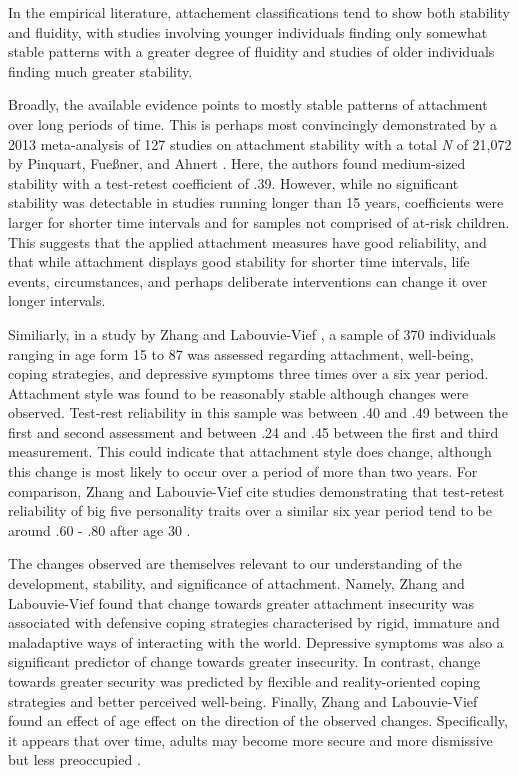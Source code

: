 \documentclass[12pt]{report}
\begin{document}
In the empirical literature, attachement classifications tend to show both stability and fluidity, with studies involving younger individuals finding only somewhat stable patterns with a greater degree of fluidity and studies of older individuals finding much greater stability.

Broadly, the available evidence points to mostly stable patterns of attachment over long periods of time. This is perhaps most convincingly demonstrated by a 2013 meta-analysis of 127 studies on attachment stability with a total \textit{N} of 21,072 by Pinquart, Fueßner, and Ahnert \cite{Pinquart2013}. Here, the authors found medium-sized stability with a test-retest coefficient of .39. However, while no significant stability was detectable in studies running longer than 15 years, coefficients were larger for shorter time intervals and for samples not comprised of at-risk children.
This suggests that the applied attachment measures have good reliability, and that while attachment displays good stability for shorter time intervals, life events, circumstances, and perhaps deliberate interventions can change it over longer intervals.

Similiarly, in a study by Zhang and Labouvie-Vief \cite{Zhang2004}, a sample of 370 individuals ranging in age form 15 to 87 was assessed regarding attachment, well-being, coping strategies, and depressive symptoms three times over a six year period. Attachment style was found to be reasonably stable although changes were observed. Test-rest reliability in this sample was between .40 and .49 between the first and second assessment and between .24 and .45 between the first and third measurement. This could indicate that attachment style does change, although this change is most likely to occur over a period of more than two years. For comparison, Zhang and Labouvie-Vief cite studies demonstrating that test-retest reliability of big five personality traits over a similar six year period tend to be around .60 - .80 after age 30 \cite{Costa1988,Roberts2000}.

The changes observed are themselves relevant to our understanding of the development, stability, and significance of attachment. Namely, Zhang and Labouvie-Vief found that change towards greater attachment insecurity was associated with defensive coping strategies characterised by rigid, immature and maladaptive ways of interacting with the world. Depressive symptoms was also a significant predictor of change towards greater insecurity. In contrast, change towards greater security was predicted by flexible and reality-oriented coping strategies and better perceived well-being.
Finally, Zhang and Labouvie-Vief found an effect of age effect on the direction of the observed changes. Specifically, it appears that over time, adults may become more secure and more dismissive but less preoccupied  \cite{Zhang2004}.
\end{document}

